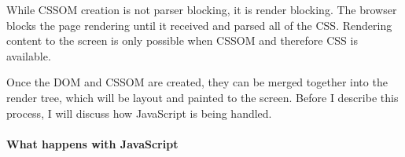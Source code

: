 




While CSSOM creation is not parser blocking, it is render blocking.
The browser blocks the page rendering until it received and parsed all of the CSS.
Rendering content to the screen is only possible when CSSOM and therefore CSS is available. %



Once the DOM and CSSOM are created, they can be merged together into the render tree, which will be layout and painted to the screen.
Before I describe this process, I will discuss how JavaScript is being handled.















\paragraph{What happens with JavaScript}



